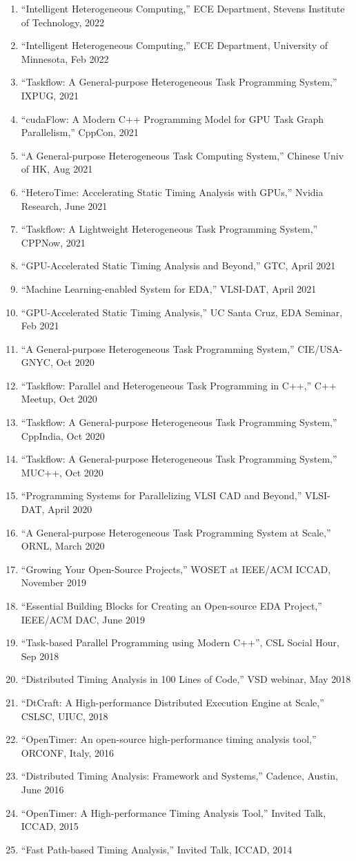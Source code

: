 \documentclass[A4,11pt]{article}
\begin{document}
\begin{enumerate}
  \item ``Intelligent Heterogeneous Computing,'' ECE Department, Stevens Institute of Technology, 2022
  \item ``Intelligent Heterogeneous Computing,'' ECE Department, University of Minnesota, Feb 2022
  \item ``Taskflow: A General-purpose Heterogeneous Task Programming System,'' IXPUG, 2021
  \item ``cudaFlow: A Modern C++ Programming Model for GPU Task Graph Parallelism,'' CppCon, 2021
  \item ``A General-purpose Heterogeneous Task Computing System,'' Chinese Univ of HK, Aug 2021
  \item ``HeteroTime: Accelerating Static Timing Analysis with GPUs,'' Nvidia Research, June 2021
  \item ``Taskflow: A Lightweight Heterogeneous Task Programming System,'' CPPNow, 2021
  \item ``GPU-Accelerated Static Timing Analysis and Beyond,'' GTC, April 2021
  \item ``Machine Learning-enabled System for EDA,'' VLSI-DAT, April 2021
  \item ``GPU-Accelerated Static Timing Analysis,'' UC Santa Cruz, EDA Seminar, Feb 2021 
  \item ``A General-purpose Heterogeneous Task Programming System,'' CIE/USA-GNYC, Oct 2020
  \item ``Taskflow: Parallel and Heterogeneous Task Programming in C++,'' C++ Meetup, Oct 2020
  \item ``Taskflow: A General-purpose Heterogeneous Task Programming System,'' CppIndia, Oct 2020
  \item ``Taskflow: A General-purpose Heterogeneous Task Programming System,'' MUC++, Oct 2020
  \item ``Programming Systems for Parallelizing VLSI CAD and Beyond,'' VLSI-DAT, April 2020
  \item ``A General-purpose Heterogeneous Task Programming System at Scale,'' ORNL, March 2020
  \item ``Growing Your Open-Source Projects,'' WOSET at IEEE/ACM ICCAD, November 2019
  \item ``Essential Building Blocks for Creating an Open-source EDA Project,'' IEEE/ACM DAC, June 2019
  \item ``Task-based Parallel Programming using Modern C++'', CSL Social Hour, Sep 2018
  \item ``Distributed Timing Analysis in 100 Lines of Code,'' VSD webinar, May 2018
  \item ``DtCraft: A High-performance Distributed Execution Engine at Scale,'' CSLSC, UIUC, 2018
  \item ``OpenTimer: An open-source high-performance timing analysis tool,'' ORCONF, Italy, 2016
  \item ``Distributed Timing Analysis: Framework and Systems,'' Cadence, Austin, June 2016
  \item ``OpenTimer: A High-performance Timing Analysis Tool,'' Invited Talk, ICCAD, 2015
  \item ``Fast Path-based Timing Analysis,'' Invited Talk, ICCAD, 2014


\end{enumerate}
\end{document}
